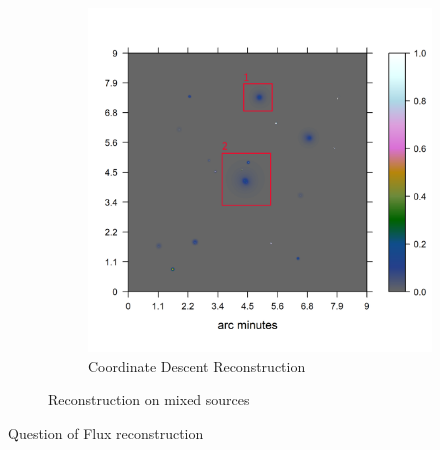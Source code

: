 \begin{figure}[h]
\begin{subfigure}[b]{0.4\linewidth}
		\includegraphics[width=\linewidth, trim={0.2in, 0.2in, 0, 0.2in}, clip]{./chapters/20.results/mixed/mixed_cd_boxed.png}
		\caption{Coordinate Descent Reconstruction}
		\label{results:mixed:cd}
	\end{subfigure}
	\caption{Reconstruction on mixed sources}
	\label{results:mixed}
\end{figure}




Question of Flux reconstruction



